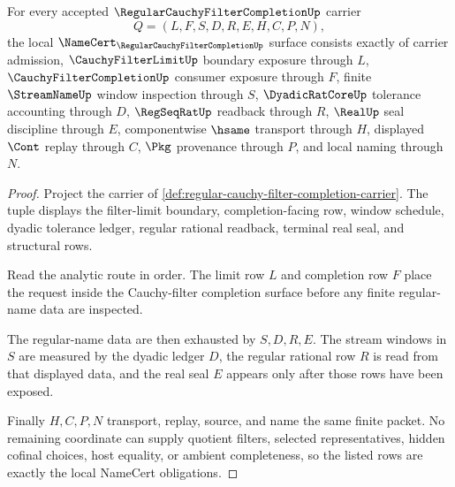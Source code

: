 \begin{theorem}
\label{thm:regular-cauchy-filter-completion-namecert-obligations}
For every accepted $\RegularCauchyFilterCompletionUp$ carrier
$$
Q=(L,F,S,D,R,E,H,C,P,N),
$$
the local $\NameCert_{\RegularCauchyFilterCompletionUp}$ surface consists exactly of carrier admission, $\CauchyFilterLimitUp$ boundary exposure through $L$, $\CauchyFilterCompletionUp$ consumer exposure through $F$, finite $\StreamNameUp$ window inspection through $S$, $\DyadicRatCoreUp$ tolerance accounting through $D$, $\RegSeqRatUp$ readback through $R$, $\RealUp$ seal discipline through $E$, componentwise $\hsame$ transport through $H$, displayed $\Cont$ replay through $C$, $\Pkg$ provenance through $P$, and local naming through $N$.
\end{theorem}
\begin{proof}
Project the carrier of \autoref{def:regular-cauchy-filter-completion-carrier}. The tuple displays the filter-limit boundary, completion-facing row, window schedule, dyadic tolerance ledger, regular rational readback, terminal real seal, and structural rows.

Read the analytic route in order. The limit row $L$ and completion row $F$ place the request inside the Cauchy-filter completion surface before any finite regular-name data are inspected.

The regular-name data are then exhausted by $S,D,R,E$. The stream windows in $S$ are measured by the dyadic ledger $D$, the regular rational row $R$ is read from that displayed data, and the real seal $E$ appears only after those rows have been exposed.

Finally $H,C,P,N$ transport, replay, source, and name the same finite packet. No remaining coordinate can supply quotient filters, selected representatives, hidden cofinal choices, host equality, or ambient completeness, so the listed rows are exactly the local NameCert obligations.
\end{proof}

